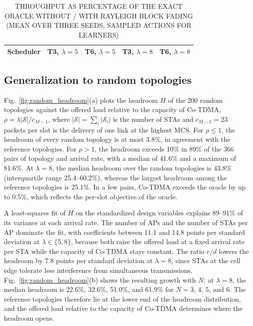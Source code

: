 \documentclass{ieeeaccess}
\begin{document}
\begin{table}
\caption{THROUGHPUT AS PERCENTAGE OF THE EXACT ORACLE WITHOUT / WITH RAYLEIGH BLOCK FADING (MEAN OVER THREE SEEDS, SAMPLED ACTIONS FOR LEARNERS)}
\label{tab:fading}
\centering
\begin{tabular}{lcccc}
\toprule
Scheduler & T3, $\lambda = 5$ & T6, $\lambda = 5$ & T3, $\lambda = 8$ & T6, $\lambda = 8$ \\
\midrule

\bottomrule
\end{tabular}
\end{table}

\subsection{Generalization to random topologies}
Fig.~\ref{fig:random_headroom}(a) plots the headroom $H$ of the 200 random topologies against the offered load relative to the capacity of Co-TDMA, $\rho = \lambda |\mathcal{S}| / c_{M-1}$, where $|\mathcal{S}| = \sum_i |\mathcal{S}_i|$ is the number of STAs and $c_{M-1} = 23$ packets per slot is the delivery of one link at the highest MCS. For $\rho \le 1$, the headroom of every random topology is at most 3.8\%, in agreement with the reference topologies. For $\rho > 1$, the headroom exceeds 10\% in 89\% of the 366 pairs of topology and arrival rate, with a median of 41.6\% and a maximum of 81.6\%. At $\lambda = 8$, the median headroom over the random topologies is 43.8\% (interquartile range 25.4--60.2\%), whereas the largest headroom among the reference topologies is 25.1\%. In a few pairs, Co-TDMA exceeds the oracle by up to 0.5\%, which reflects the per-slot objective of the oracle.

A least-squares fit of $H$ on the standardized design variables explains 89--91\% of its variance at each arrival rate. The number of APs and the number of STAs per AP dominate the fit, with coefficients between 11.1 and 14.8 points per standard deviation at $\lambda \in \{5, 8\}$, because both raise the offered load at a fixed arrival rate per STA while the capacity of Co-TDMA stays constant. The ratio $r/d$ lowers the headroom by 7.8 points per standard deviation at $\lambda = 8$, since STAs at the cell edge tolerate less interference from simultaneous transmissions. Fig.~\ref{fig:random_headroom}(b) shows the resulting growth with $N$: at $\lambda = 8$, the median headroom is 22.6\%, 32.6\%, 51.0\%, and 61.9\% for $N = 3$, 4, 5, and 6. The reference topologies therefore lie at the lower end of the headroom distribution, and the offered load relative to the capacity of Co-TDMA determines where the headroom opens.
\end{document}
